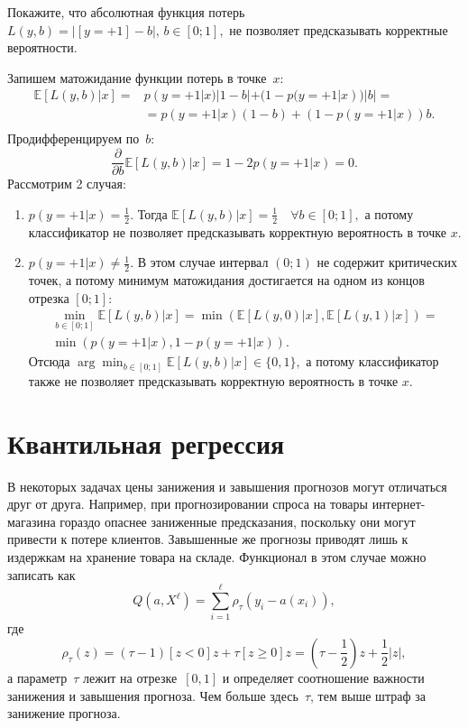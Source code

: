 \documentclass[12pt,a4paper]{article}
\begin{document}
\begin{vkProblem} Покажите, что абсолютная функция потерь~$L(y, b) = |[y = +1] - b|, \, b \in [0; 1],$
	не позволяет предсказывать корректные вероятности.
\end{vkProblem}
\begin{esSolution}
	Запишем матожидание функции потерь в точке~$x$:
	\begin{align*}
		\mathbb{E} \left[ L(y, b)|x\right] = &p(y=+1|x)|1-b| + (1 - p(y=+1|x))|b| = \\
		&= p(y=+1|x)(1-b)+ (1 - p(y=+1|x))b.\\
	\end{align*}
	Продифференцируем по~$b$:
	$$\frac{\partial}{\partial b}
	\mathbb{E} \left[
	L(y, b)
	|
	x
	\right] =
	1 - 2 p(y = +1 | x) = 0.$$
	Рассмотрим 2 случая:
	\begin{enumerate}
		\item $p(y=+1|x) = \frac{1}{2}.$ Тогда $\mathbb{E} \left[ L(y, b)|x\right] = \frac{1}{2} \quad \forall b \in [0; 1],$ а потому классификатор не позволяет предсказывать корректную вероятность в точке $x$.
		\item $p(y=+1|x) \ne \frac{1}{2}.$ В этом случае интервал $(0; 1)$ не содержит критических точек, а потому минимум матожидания достигается на одном из концов отрезка $[0; 1]:$
		\begin{align*}
			\min_{b \in [0;1]} \mathbb{E} \left[ L(y, b)|x\right] = 
			\min \left(\mathbb{E} \left[ L(y, 0)|x\right], \mathbb{E} \left[ L(y, 1)|x\right] \right) =\\
			\min \left(p(y = +1 | x), 1 - p(y = +1 | x)\right).
		\end{align*}
		Отсюда $\arg \min_{b \in [0;1]} \mathbb{E} \left[ L(y, b)|x\right] \in \{0, 1\},$ а потому классификатор также не позволяет предсказывать корректную вероятность в точке $x$.
	\end{enumerate}
\end{esSolution}

\section{Квантильная регрессия}

В некоторых задачах цены занижения и завышения прогнозов могут отличаться друг от друга.
Например, при прогнозировании спроса на товары интернет-магазина гораздо опаснее заниженные
предсказания, поскольку они могут привести к потере клиентов.
Завышенные же прогнозы приводят лишь к издержкам на хранение товара на складе.
Функционал в этом случае можно записать как
\[
    Q(a, X^\ell)
    =
    \sum_{i = 1}^{\ell}
        \rho_\tau(y_i - a(x_i)),
\]
где
\[
    \rho_\tau(z)
    =
    (\tau - 1) [z < 0] z
    +
    \tau [z \geq 0] z
    =
    (\tau - \frac{1}{2})z + \frac{1}{2} |z|,
\]
а параметр~$\tau$ лежит на отрезке~$[0, 1]$ и определяет
соотношение важности занижения и завышения прогноза.
Чем больше здесь~$\tau$, тем выше штраф за занижение прогноза.
\end{document}
